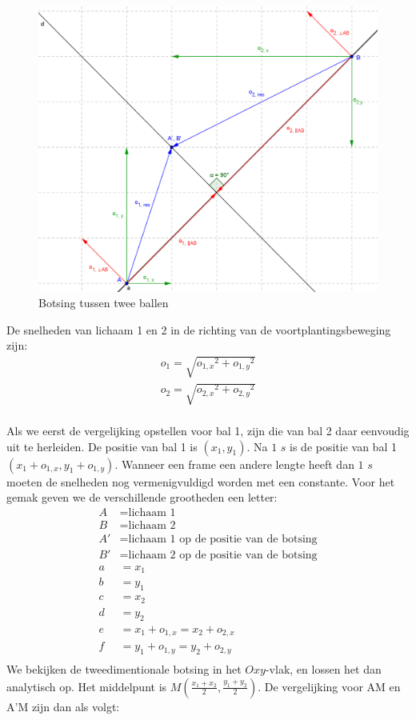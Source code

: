 \documentclass[12pt,a4paper]{article}
\begin{document}
	\begin{figure}[h]
		\centerline{\includegraphics[width=\textwidth]{Plaatjes/niet-centrale-botsing.png}}
		\caption{Botsing tussen twee ballen}
		\label{niet-centrale botsing}
	\end{figure}
	De snelheden van lichaam 1 en 2  in de richting van de voortplantingsbeweging zijn:
	\begin{equation}
		\begin{aligned}
			o_1=\sqrt{{o_{1,x}}^2+{{o_{1,y}}^2}}\\
			o_2=\sqrt{{o_{2,x}}^2+{{o_{2,y}}^2}}\\
		\end{aligned}
	\end{equation}

	Als we eerst de vergelijking opstellen voor bal 1, zijn die van bal 2 daar eenvoudig uit te herleiden. De positie van bal 1 is $(x_1,y_1)$. Na $\text{1 }s$ is de positie van bal 1 $(x_1+o_{1,x},y_1+o_{1,y})$. Wanneer een frame een andere lengte heeft dan $\text{1 }s$ moeten de snelheden nog vermenigvuldigd worden met een constante. Voor het gemak geven we de verschillende grootheden een letter:
	\begin{equation}
		\begin{aligned}
			A&=\text{lichaam 1}\\
			B&=\text{lichaam 2}\\
			A'&=\text{lichaam 1 op de positie van de botsing}\\
			B'&=\text{lichaam 2 op de positie van de botsing}\\
			a&={x_1}\\
			b&={y_1}\\
			c&={x_2}\\
			d&={y_2}\\
			e&={x_1+o_{1,x}}={x_2+o_{2,x}}\\
			f&={y_1+o_{1,y}}={y_2+o_{2,y}}\\
		\end{aligned}
	\end{equation}
	We bekijken de tweedimentionale botsing in het $Oxy$-vlak, en lossen het dan analytisch op. Het middelpunt is $M(\frac{x_1+x_2}{2}, \frac{y_1+y_2}{2})$. De vergelijking voor AM en A'M zijn dan als volgt:
\end{document}
